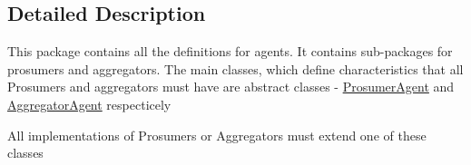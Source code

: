 \subsection{Detailed Description}
This package contains all the definitions for agents. It contains sub-\/packages for prosumers and aggregators. The main classes, which define characteristics that all Prosumers and aggregators must have are abstract classes -\/ \hyperlink{}{Prosumer\-Agent} and \hyperlink{}{Aggregator\-Agent} respecticely

All implementations of Prosumers or Aggregators must extend one of these classes 